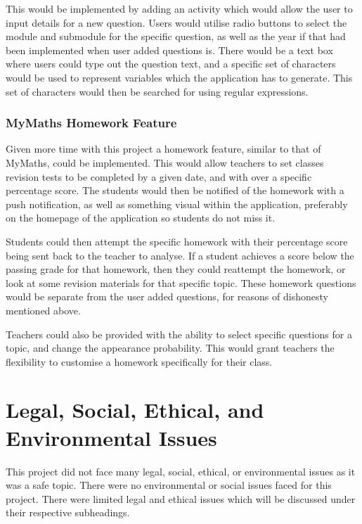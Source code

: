 \documentclass{article}
\begin{document}
This would be implemented by adding an activity which would allow the user to input details for a new question. Users would utilise radio buttons to select the module and submodule for the specific question, as well as the year if that had been implemented when user added questions is. There would be a text box where users could type out the question text, and a specific set of characters would be used to represent variables which the application has to generate. This set of characters would then be searched for using regular expressions. \par

\subsubsection{MyMaths Homework Feature}

Given more time with this project a homework feature, similar to that of MyMaths, could be implemented. This would allow teachers to set classes revision tests to be completed by a given date, and with over a specific percentage score. The students would then be notified of the homework with a push notification, as well as something visual within the application, preferably on the homepage of the application so students do not miss it. \par

Students could then attempt the specific homework with their percentage score being sent back to the teacher to analyse. If a student achieves a score below the passing grade for that homework, then they could reattempt the homework, or look at some revision materials for that specific topic. These homework questions would be separate from the user added questions, for reasons of dishonesty mentioned above. \par

Teachers could also be provided with the ability to select specific questions for a topic, and change the appearance probability. This would grant teachers the flexibility to customise a homework specifically for their class. \par

\section{Legal, Social, Ethical, and Environmental Issues}
\label{section:issues}

This project did not face many legal, social, ethical, or environmental issues as it was a safe topic. There were no environmental or social issues faced for this project. There were limited legal and ethical issues which will be discussed under their respective subheadings. 
\end{document}
